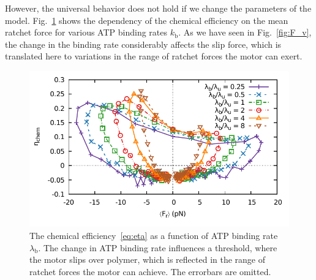 \documentclass[aps,pre,twocolumn,showpacs,showkeys,superscriptaddress,floatfix]{revtex4-1}
\begin{document}
However, the universal behavior does not hold if we change the parameters of the model. 
Fig.~\ref{fig:rates_efficiencty} shows the dependency of the chemical efficiency on the mean ratchet force for various ATP binding rates $k_\text{b}$. 
As we have seen in Fig.~\ref{fig:F_v}, the change in the binding rate considerably affects the slip force, 
which is translated here to variations in the range of ratchet forces the motor can exert.
\begin{figure}[t]
\centering
\includegraphics[width=.9\linewidth,height=!]{lambda_eta.pdf}
\caption{\label{fig:rates_efficiencty}
The chemical efficiency~\eqref{eq:eta} as a function of ATP binding rate $\lambda_\text{b}$.
The change in ATP binding rate influences a threshold, where the motor slips over polymer, which is reflected in the range of ratchet forces the motor can achieve. 
The errorbars are omitted. 
}
\end{figure}
\end{document}
